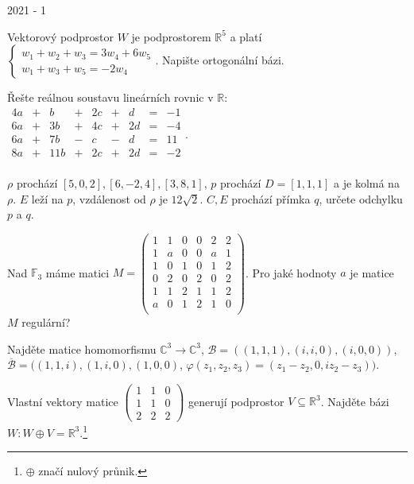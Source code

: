 
\newpage
{\large 2021 - 1}

\begin{questions}

\question Vektorový podprostor \(W\) je podprostorem \(\mathbb{R}^5\) a platí \(\left\{
    \begin{array}{l}
        w_1 + w_2 + w_3 = 3w_4 + 6w_5\\
        w_1 + w_3 + w_5 = -2w_4
    \end{array}
\right.\). Napište ortogonální bázi.

\question Řešte reálnou soustavu lineárních rovnic v \(\mathbb{R}\): \(\begin{matrix}
    4a & + &   b & + & 2c & + &  d & = & -1\\
    6a & + &  3b & + & 4c & + & 2d & = & -4\\
    6a & + &  7b & - &  c & - &  d & = & 11\\
    8a & + & 11b & + & 2c & + & 2d & = & -2\\
\end{matrix}\).

\newpage
\question \(\rho\) prochází \([5,0,2], [6,-2,4], [3,8,1]\), \(p\) prochází \(D=[1,1,1]\) a je kolmá na \(\rho\). \(E\) leží na \(p\), vzdálenost od \(\rho\) je \(12\sqrt{2}\). \(C, E\) prochází přímka \(q\), určete odchylku \(p\) a \(q\).

\question Nad \(\mathbb{F}_3\) máme matici \(M = \begin{pmatrix}
    1 & 1 & 0 & 0 & 2 & 2\\
    1 & a & 0 & 0 & a & 1\\
    1 & 0 & 1 & 0 & 1 & 2\\
    0 & 2 & 0 & 2 & 0 & 2\\
    1 & 1 & 2 & 1 & 1 & 2\\
    a & 0 & 1 & 2 & 1 & 0\\
\end{pmatrix}\). Pro jaké hodnoty \(a\) je matice \(M\) regulární?

\newpage
\question Najděte matice homomorfismu \(\mathbb{C}^3 \rightarrow \mathbb{C}^3\), \(\mathcal{B} = ((1,1,1),(i,i,0),(i,0,0))\), \(\overline{\mathcal{B}} = ((1,1,i), (1,i,0), (1,0,0)\), \(\varphi(z_1, z_2, z_3) = (z_1-z_2, 0, iz_2-z_3))\).

\question Vlastní vektory matice \(\begin{pmatrix}
    1 & 1 & 0\\
    1 & 1 & 0\\
    2 & 2 & 2
\end{pmatrix}\) generují podprostor \(V \subseteq \mathbb{R}^3\). Najděte bázi \(W: W \oplus V = \mathbb{R}^3\).\footnote{\(\oplus\) značí nulový průnik.}

\end{questions}

